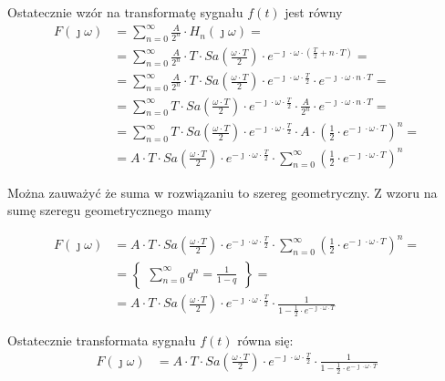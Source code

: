 \begin{task}
Ostatecznie wzór na transformatę sygnału $f(t)$ jest równy 
\begin{align*}
F(\jmath\omega) &= \sum_{n=0}^{\infty}  \frac{A}{2^{n}}\cdot H_{n}(\jmath\omega)=\\
&=\sum_{n=0}^{\infty}  \frac{A}{2^{n}}\cdot T \cdot Sa\left(\frac{\omega \cdot T}{2}\right) \cdot e^{-\jmath \cdot \omega \cdot \left(\frac{T}{2} + n\cdot T\right)}=\\
&=\sum_{n=0}^{\infty}  \frac{A}{2^{n}}\cdot T \cdot Sa\left(\frac{\omega \cdot T}{2}\right) \cdot e^{-\jmath \cdot \omega \cdot \frac{T}{2}} \cdot e^{-\jmath \cdot \omega \cdot n\cdot T}=\\
&=\sum_{n=0}^{\infty} T \cdot Sa\left(\frac{\omega \cdot T}{2}\right) \cdot e^{-\jmath \cdot \omega \cdot \frac{T}{2}} \cdot  \frac{A}{2^{n}}\cdot e^{-\jmath \cdot \omega \cdot n\cdot T}=\\
&=\sum_{n=0}^{\infty} T \cdot Sa\left(\frac{\omega \cdot T}{2}\right) \cdot e^{-\jmath \cdot \omega \cdot \frac{T}{2}} \cdot  A \cdot \left(\frac{1}{2}\cdot e^{-\jmath \cdot \omega \cdot T}\right)^n=\\
&=A \cdot T \cdot Sa\left(\frac{\omega \cdot T}{2}\right) \cdot e^{-\jmath \cdot \omega \cdot \frac{T}{2}} \cdot  \sum_{n=0}^{\infty} \left(\frac{1}{2}\cdot e^{-\jmath \cdot \omega \cdot T}\right)^n
\end{align*}

Można zauważyć że suma w rozwiązaniu to szereg geometryczny. Z wzoru na sumę szeregu geometrycznego mamy

\begin{align*}
F(\jmath\omega) &=A \cdot T \cdot Sa\left(\frac{\omega \cdot T}{2}\right) \cdot e^{-\jmath \cdot \omega \cdot \frac{T}{2}} \cdot  \sum_{n=0}^{\infty} \left(\frac{1}{2}\cdot e^{-\jmath \cdot \omega \cdot T}\right)^n=\\
&=\begin{Bmatrix}
\sum_{n=0}^{\infty}q^n = \frac{1}{1-q}
\end{Bmatrix}=\\
&=A \cdot T \cdot Sa\left(\frac{\omega \cdot T}{2}\right) \cdot e^{-\jmath \cdot \omega \cdot \frac{T}{2}} \cdot \frac{1}{1 - \frac{1}{2}\cdot e^{-\jmath \cdot \omega \cdot T}}
\end{align*}

Ostatecznie transformata sygnału $f(t)$ równa się:
\begin{align*}
F(\jmath\omega) &=A \cdot T \cdot Sa\left(\frac{\omega \cdot T}{2}\right) \cdot e^{-\jmath \cdot \omega \cdot \frac{T}{2}} \cdot \frac{1}{1 - \frac{1}{2}\cdot e^{-\jmath \cdot \omega \cdot T}}
\end{align*}

\end{task}

